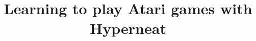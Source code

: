 \documentclass{acm_proc_article-sp}
\begin{document}
\title{Learning to play Atari games with Hyperneat}
%
%
%
%
%
\end{document}
